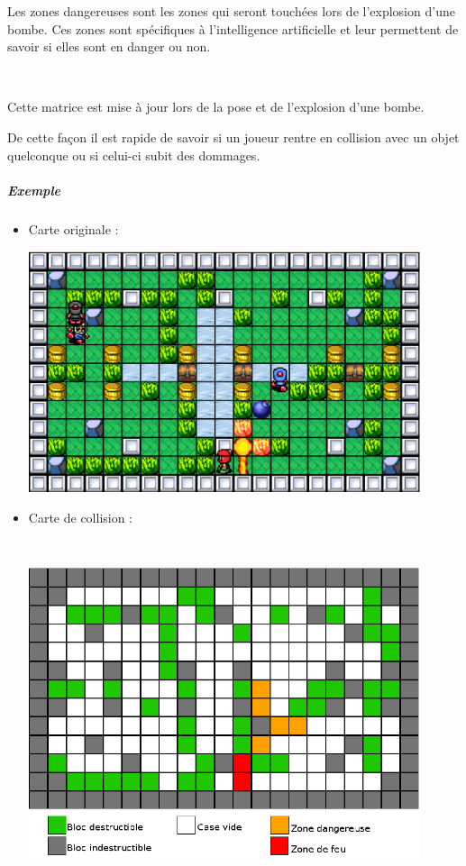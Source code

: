 			Les zones dangereuses sont les zones qui seront touchées lors de l'explosion
			d'une bombe. Ces zones sont spécifiques à l'intelligence artificielle et leur
			permettent de savoir si elles sont en danger ou non.
			
			
			$\,$
			
			Cette matrice est mise à jour lors de la pose et de l'explosion d'une bombe.
			
			De cette façon il est rapide de savoir si un joueur rentre en collision avec
			un objet quelconque ou si celui-ci subit des dommages.
			
			\subparagraph{Exemple}
			
				\begin{itemize}
				  \item Carte originale :
				  
						\begin{center}						
							\includegraphics[width=115mm,height=71mm]{Developpement/Img/mapcolision_1.eps}
						\end{center}				  		
				  
				  \item Carte de collision :
				  
						\begin{center}						
							\includegraphics[width=115mm,height=102mm]{Developpement/Img/mapcolision_2.eps}
						\end{center}
						
				\end{itemize}
		

